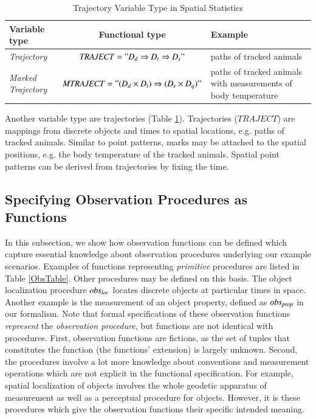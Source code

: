 \documentclass[final,authoryear,1p,times]{elsarticle}
\begin{document}
\begin{table}[htb]
\caption{Trajectory Variable Type in Spatial Statistics}
\label{trajectVarTable}
\begin{tabular}[h]{|p{2.5cm}|c|p{3.8cm}|}
			\hline
			\textbf{Variable type} & \textbf{Functional type} &  \textbf{Example} \\
			\hline
			\textit{Trajectory} & $ \it{TRAJECT = "D_d \Rightarrow 				 
			  D_t \Rightarrow D_s"}$ & paths of tracked animals \\
			  \hline	
			  \textit{Marked Trajectory} & $ \it{MTRAJECT = "(D_d \times 				 
			  D_t) \Rightarrow (D_s \times D_q)"}$ & paths of tracked animals with measurements of body temperature \\
			  \hline	
\end{tabular}
\end{table}

Another variable type are trajectories (Table \ref{trajectVarTable}). Trajectories ($TRAJECT$) are mappings from discrete objects and times to spatial locations, e.g. paths of tracked animals. Similar to point patterns, marks may be attached to the spatial positions, e.g. the body temperature of the tracked animals. Spatial point patterns can be derived from trajectories by fixing the time.

\subsection{Specifying Observation Procedures as Functions}
\label{observations}

In this subsection, we show how observation functions can be defined which capture essential knowledge about  observation procedures underlying our example scenarios. Examples of functions representing \textit{primitive} procedures are listed in Table \ref{ObsTable}. Other procedures may be defined on this basis. The object localization procedure $\it{{obs}_{loc}}$ locates discrete objects at particular times in space. Another example is the measurement of an object property, defined as ${\it obs_{prop}}$ in our formalism. Note that formal specifications of these observation functions \textit{represent} the \textit{observation procedure}, but functions are not identical with procedures. First, observation functions are fictions, as the set of tuples that constitutes the function (the functions' extension) is largely unknown.  Second, the procedures involve a lot more knowledge about conventions and measurement operations which are not explicit in the functional specification. For example, spatial localization of objects involves the whole geodetic apparatus of measurement as well as a perceptual procedure for objects. However, it is these procedures which give the observation functions their specific intended meaning.
\end{document}
